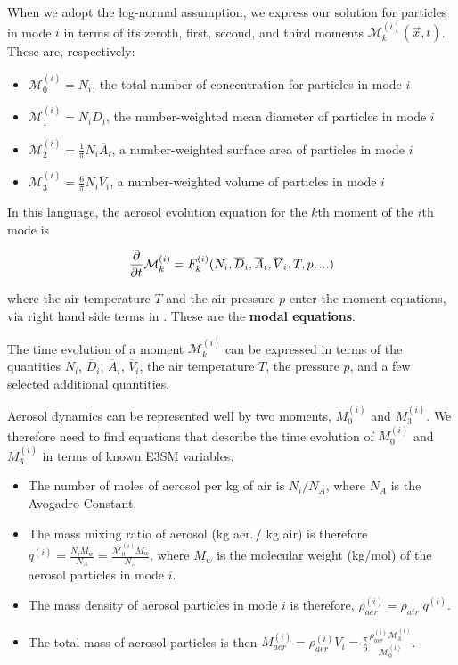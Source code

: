 When we adopt the log-normal assumption, we express our solution for particles in
mode $i$ in terms of its zeroth, first, second, and third moments
$\mathcal{M}_k^{(i)}(\vec{x}, t)$. These are, respectively:
\begin{itemize}
  \item $\mathcal{M}_0^{(i)} = N_i$, the total number of concentration for particles
        in mode $i$
  \item $\mathcal{M}_1^{(i)} = N_i\overline{D}_i$, the number-weighted mean diameter of
        particles in mode $i$
  \item $\mathcal{M}_2^{(i)} = \frac{1}{\pi}N_i\overline{A}_i$, a number-weighted
        surface area of particles in mode $i$
  \item $\mathcal{M}_3^{(i)} = \frac{6}{\pi}N_i\overline{V}_i$, a number-weighted
        volume of particles in mode $i$
\end{itemize}

In this language, the aerosol evolution equation for the $k$th moment of the
$i$th mode is

\begin{equation}\labeleq{modal_evolution}
  \ddt\mathcal{M}_k^{(i)} = F_k^{(i)}(N_i, \overline{D}_i, \overline{A}_i, \overline{V}_i, T, p, \mathsf{...})
\end{equation}

where the air temperature $T$ and the air pressure $p$ enter the moment
equations, via right hand side terms in . These are the
{\bf modal equations}.

\begin{assume}
   The time evolution of a moment $\mathcal{M}_k^{(i)}$ can be
    expressed in terms of the quantities $N_i$, $\overline{D}_i$,
    $\overline{A}_i$, $\overline{V}_i$, the air temperature $T$, the pressure $p$, and a few
    selected additional quantities.
\end{assume}

\begin{assume}
  Aerosol dynamics can be represented well by two moments, $M_0^{(i)}$ and $M_3^{(i)}$.
  We therefore need to find equations that describe the time evolution of $M_0^{(i)}$ and $M_3^{(i)}$ in terms of known E3SM variables.
  \begin{itemize}
    \item The number of moles of aerosol per kg of air is $N_i/N_A$, where $N_A$ is the Avogadro Constant.
    \item The mass mixing ratio of aerosol (kg aer.\,/ kg air) is therefore $\displaystyle q^{(i)} = \frac{N_i M_w}{N_A} = \frac{\mathcal{M}_0^{(i)}M_w}{N_A}$, where $M_w$ is the molecular weight (kg/mol) of the aerosol particles in mode $i$.
    \item The mass density of aerosol particles in mode $i$ is therefore, $\rho_{aer}^{(i)} =\rho_{air} \;q^{(i)}$.
    \item The total mass of aerosol particles is then $\displaystyle M_{aer}^{(i)}=\rho_{aer}^{(i)} \overline{V_i} = \frac{\pi}{6}\frac{\rho_{aer}^{(i)}\mathcal{M}_3^{(i)}}{\mathcal{M}_0^{(i)}}$.
  \end{itemize}
\end{assume}

